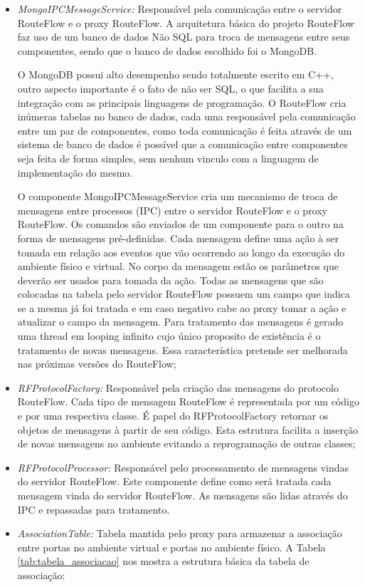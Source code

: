 \begin{itemize}
\item \textit{MongoIPCMessageService:} Responsável pela
 comunicação entre o servidor RouteFlow e o proxy 
RouteFlow. A arquitetura básica do projeto RouteFlow 
faz uso de um banco de dados Não SQL para troca de 
mensagens entre seus componentes, sendo que o banco 
de dados escolhido foi o MongoDB. 

O MongoDB possui 
alto desempenho sendo totalmente escrito em C++, outro
 aspecto importante é o fato de não ser SQL, o 
que facilita a sua integração com as  principais linguagens
 de programação. 
O RouteFlow cria inúmeras tabelas no banco de dados, cada uma 
responsável pela comunicação entre um par 
de componentes, como toda comunicação é feita através de um 
sistema de banco de dados é possível que a 
comunicação entre componentes seja feita de forma simples, sem 
nenhum vinculo com a linguagem de 
implementação do mesmo. 

O componente MongoIPCMessageService 
cria um mecanismo de troca de mensagens entre processos (IPC) 
entre o servidor RouteFlow e o proxy RouteFlow. Os comandos são 
enviados de um componente para o outro 
na forma de mensagens pré-definidas. Cada mensagem define uma 
ação à ser tomada em relação aos eventos 
que vão ocorrendo ao longo da execução do ambiente físico e virtual. No corpo da 
mensagem estão os parâmetros que 
deverão ser usados para tomada da ação. Todas as mensagens que 
são colocadas na tabela pelo servidor RouteFlow 
possuem um campo que indica se a mesma já foi tratada e em caso 
negativo cabe ao proxy tomar a ação e 
atualizar o campo da mensagem. Para tratamento das mensagens é 
gerado uma thread em looping infinito 
cujo único proposito de existência é o tratamento de novas mensagens. 
Essa característica pretende ser melhorada nas próximas versões 
do RouteFlow;
\item \textit{RFProtocolFactory:} Responsável pela criação das 
mensagens do protocolo RouteFlow. Cada 
tipo de mensagem RouteFlow é representada por um código e 
por uma respectiva classe. É papel do 
RFProtocolFactory retornar os objetos de mensagens à partir de 
seu código. Esta estrutura facilita a 
inserção de novas mensagens no ambiente evitando a reprogramação 
de outras classes;
\item \textit{RFProtocolProcessor:} Responsável pelo processamento 
de mensagens vindas do servidor 
RouteFlow. Este componente define como será tratada cada mensagem 
vinda do servidor RouteFlow. As 
mensagens são lidas através do IPC e repassadas para tratamento.
\item \textit{AssociationTable:} Tabela mantida pelo proxy para armazenar 
a associação entre portas no 
ambiente virtual e portas no ambiente físico. A Tabela \ref{tab:tabela_associacao} nos 
mostra a estrutura básica da tabela de associação:


\end{itemize}
